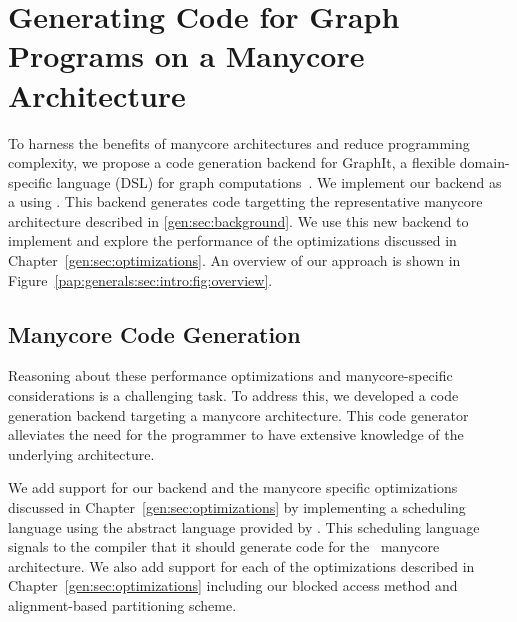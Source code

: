 \chapter{Generating Code for Graph Programs on a Manycore Architecture}\label{gen:sec:graphitbackend}
%

\introOverviewFigure

To harness the benefits of manycore architectures and reduce programming complexity, we propose a code generation backend for GraphIt, a flexible domain-specific language (DSL) for graph computations~\cite{zhang2018graphit}. 
We implement our backend as a \graphvm using \ugc.
This backend generates code targetting the representative manycore architecture described in \ref{gen:sec:background}.
We use this new backend to implement and explore the performance of the optimizations discussed in Chapter~\ref{gen:sec:optimizations}.
An overview of our approach is shown in Figure~\ref{pap:generals:sec:intro:fig:overview}.

\section{Manycore Code Generation}\label{sec:method:sub:baseline}

Reasoning about these performance optimizations and manycore-specific considerations is a challenging task.
To address this, we developed a code generation backend targeting a manycore architecture.
This code generator alleviates the need for the programmer to have extensive knowledge of the underlying architecture.

We add support for our backend and the manycore specific optimizations discussed in Chapter~\ref{gen:sec:optimizations} by implementing a \hb scheduling language using the abstract language provided by \GG.
This scheduling language signals to the \graphit compiler that it should generate code for the \hb~manycore architecture.
We also add support for each of the optimizations described in Chapter~\ref{gen:sec:optimizations} including our blocked access method and alignment-based partitioning scheme.

